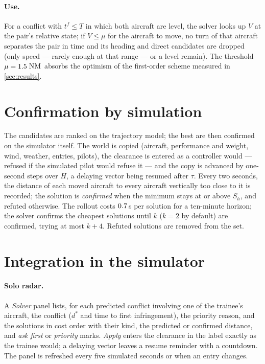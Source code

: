 \documentclass[11pt,a4paper]{article}
\newcommand{\Sh}{S_h}
\newcommand{\NM}{\ensuremath{\,\mathrm{NM}}}
\begin{document}
\paragraph{Use.} For a conflict with $t^f\le T$ in which both aircraft are level, the solver looks up
$V$ at the pair's relative state; if $V\le\mu$ for the aircraft to move, no turn of that aircraft separates the
pair in time and its heading and direct candidates are dropped (only speed --- rarely enough at that range --- or a
level remain). The threshold $\mu=1.5$\NM\ absorbs the optimism of the first-order scheme measured in
\cref{sec:results}.

\section{Confirmation by simulation}\label{sec:confirm}

The candidates are ranked on the trajectory model; the best are then confirmed on the simulator itself. The world
is copied (aircraft, performance and weight, wind, weather, entries, pilots), the clearance is entered as a
controller would --- refused if the simulated pilot would refuse it --- and the copy is advanced by one-second steps
over $H$, a delaying vector being resumed after $\tau$. Every two seconds, the distance of each moved aircraft to
every aircraft vertically too close to it is recorded; the solution is \emph{confirmed} when the minimum stays at or
above $\Sh$, and refuted otherwise. The rollout costs $0.7$\,s per solution for a ten-minute horizon; the
solver confirms the cheapest solutions until $k$ ($k=2$ by default) are confirmed, trying at most $k+4$.
Refuted solutions are removed from the set.

\section{Integration in the simulator}\label{sec:integration}

\paragraph{Solo radar.} A \emph{Solver} panel lists, for each predicted conflict involving one of the trainee's
aircraft, the conflict ($d^*$ and time to first infringement), the priority reason, and the solutions in cost order
with their kind, the predicted or confirmed distance, and \emph{ask first} or \emph{priority} marks. \emph{Apply}
enters the clearance in the label exactly as the trainee would; a delaying vector leaves a resume reminder with a
countdown. The panel is refreshed every five simulated seconds or when an entry changes.
\end{document}
